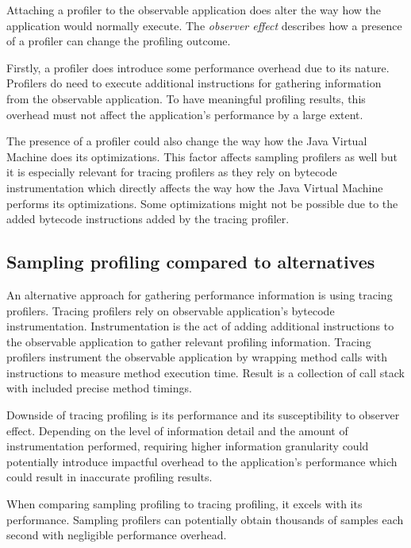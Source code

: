 \documentclass[..thesis.tex]{subfiles}
\begin{document}
Attaching a profiler to the observable application does alter the way how the application would normally execute. The \textit{observer effect} describes how a presence of a profiler can change the profiling outcome.
 
Firstly, a profiler does introduce some performance overhead due to its nature. Profilers do need to execute additional instructions for gathering information from the observable application. To have meaningful profiling results, this overhead must not affect the application's performance by a large extent.

The presence of a profiler could also change the way how the Java Virtual Machine does its optimizations. This factor affects sampling profilers as well but it is especially relevant for tracing profilers as they rely on bytecode instrumentation which directly affects the way how the Java Virtual Machine performs its optimizations. Some optimizations might not be possible due to the added bytecode instructions added by the tracing profiler. \cite{mytkowicz_evaluating_2010} 

\subsection{Sampling profiling compared to alternatives}

An alternative approach for gathering performance information is using tracing profilers. Tracing profilers rely on observable application's bytecode instrumentation. Instrumentation is the act of adding additional instructions to the observable application to gather relevant profiling information. Tracing profilers instrument the observable application by wrapping method calls with instructions to measure method execution time. Result is a collection of call stack with included precise method timings. 

Downside of tracing profiling is its performance and its susceptibility to observer effect. Depending on the level of information detail and the amount of instrumentation performed, requiring higher information granularity could potentially introduce impactful overhead to the application's performance which could result in inaccurate profiling results. 

When comparing sampling profiling to tracing profiling, it excels with its performance. Sampling profilers can potentially obtain thousands of samples each second with negligible performance overhead.
\end{document}
